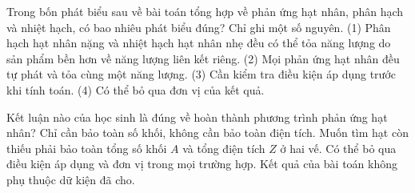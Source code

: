 \begin{ex}
Trong bốn phát biểu sau về bài toán tổng hợp về phản ứng hạt nhân, phân hạch và nhiệt hạch, có bao nhiêu phát biểu đúng? Chỉ ghi một số nguyên. (1) Phân hạch hạt nhân nặng và nhiệt hạch hạt nhân nhẹ đều có thể tỏa năng lượng do sản phẩm bền hơn về năng lượng liên kết riêng. (2) Mọi phản ứng hạt nhân đều tự phát và tỏa cùng một năng lượng. (3) Cần kiểm tra điều kiện áp dụng trước khi tính toán. (4) Có thể bỏ qua đơn vị của kết quả.
\end{ex}

\begin{ex}
Kết luận nào của học sinh là đúng về hoàn thành phương trình phản ứng hạt nhân?
\choice
{Chỉ cần bảo toàn số khối, không cần bảo toàn điện tích.}
{\True Muốn tìm hạt còn thiếu phải bảo toàn tổng số khối $A$ và tổng điện tích $Z$ ở hai vế.}
{Có thể bỏ qua điều kiện áp dụng và đơn vị trong mọi trường hợp.}
{Kết quả của bài toán không phụ thuộc dữ kiện đã cho.}
\end{ex}

